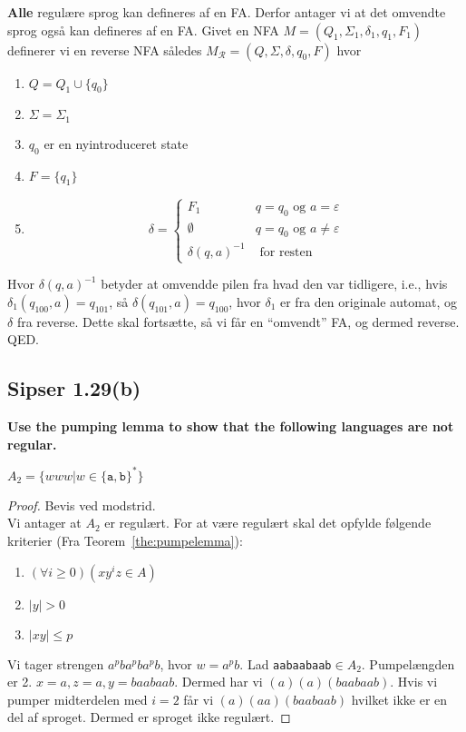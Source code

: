 \textbf{Alle} regulære sprog kan defineres af en FA. Derfor antager vi at det omvendte sprog også kan defineres af en FA. Givet en NFA $M = (Q_{1}, \Sigma_{1}, \delta_{1}, q_{1}, F_{1})$ definerer vi en reverse NFA således $M_{\mathcal{R}} = (Q, \Sigma, \delta, q_{0}, F)$ hvor
\begin{enumerate}
  \item $Q = Q_{1} \cup \{q_{0}\}$
  \item $\Sigma = \Sigma_{1}$
  \item $q_{0}$ er en nyintroduceret state
  \item $F = \{q_{1}\}$
  \item
        \begin{equation*}
          \delta =
\begin{cases}
  F_{1} & q = q_{0} \text{ og } a = \varepsilon \\
  \emptyset & q = q_{0} \text{ og } a \neq \varepsilon \\
  \delta(q,a)^{-1} & \text{ for resten}
\end{cases}
        \end{equation*}
\end{enumerate}
Hvor $\delta(q,a)^{-1}$ betyder at omvendde pilen fra hvad den var tidligere, i.e., hvis $\delta_{1}(q_{100},a) = q_{101}$, så $\delta(q_{101}, a) = q_{100}$, hvor $\delta_{1}$ er fra den originale automat, og $\delta$ fra reverse. Dette skal fortsætte, så vi får en ``omvendt'' FA, og dermed reverse. QED.

\subsection{Sipser 1.29(b)}%
\label{subsec:label}

\textbf{Use the pumping lemma to show that the following languages are not regular.}

$A_{2} = \{www|w \in \{\mathtt{a,b}\}^{*}\}$

\begin{proof}
  Bevis ved modstrid.\\
  Vi antager at $A_{2}$ er regulært. For at være regulært skal det opfylde følgende kriterier (Fra Teorem~\ref{the:pumpelemma}):
  \begin{enumerate}
    \item $(\forall i \geq 0)(xy^{i}z \in A)$
    \item $|y| > 0$
    \item $|xy| \leq p$
  \end{enumerate}

  Vi tager strengen $a^{p}ba^{p}ba^{p}b$, hvor $w = a^{p}b$. Lad \texttt{aabaabaab}$\in A_{2}$. Pumpelængden er 2. $x = a, z = a, y = baabaab$. Dermed har vi $(a)(a)(baabaab)$. Hvis vi pumper midterdelen med $i = 2$ får vi $(a)(aa)(baabaab)$ hvilket ikke er en del af sproget. Dermed er sproget ikke regulært.
\end{proof}


